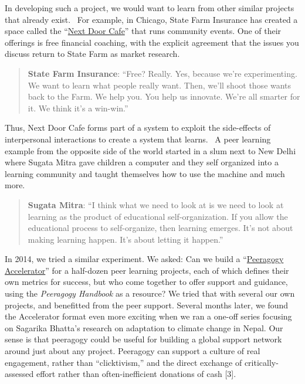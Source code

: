 In developing such a project, we would want to learn from other similar
projects that already exist. ~For example, in Chicago, State Farm
Insurance has created a space called the
``\href{https://www.nextdoorchi.com/}{Next Door Cafe}'' that runs
community events. One of their offerings is free financial coaching,
with the explicit agreement that the issues you discuss return to State
Farm as market research.

\begin{quote}
\textbf{State Farm Insurance}: ``Free? Really. Yes, because we're
experimenting. We want to learn what people really want. Then, we'll
shoot those wants back to the Farm. We help you. You help us innovate.
We're all smarter for it. We think it's a win-win.''
\end{quote}

Thus, Next Door Cafe forms part of a system to exploit the side-effects
of interpersonal interactions to create a system that learns.~ A peer
learning example from the opposite side of the world started in a slum
next to New Delhi where Sugata Mitra gave children a computer and they
self organized into a learning community and taught themselves how to
use the machine and much more.

\begin{quote}
\textbf{Sugata Mitra}: ``I think what we need to look at is we need to
look at learning as the product of educational self-organization. If you
allow the educational process to self-organize, then learning emerges.
It's not about making learning happen. It's about letting it happen.''
\end{quote}

In 2014, we tried a similar experiment. We asked: Can we build a
``\href{http://commonsabundance.net/docs/help-build-the-peeragogy-accelerator-work-in-progress/}{Peeragogy
Accelerator}'' for a half-dozen peer learning projects, each of which
defines their own metrics for success, but who come together to offer
support and guidance, using the \emph{Peeragogy Handbook} as a resource?
We tried that with several our own projects, and benefitted from the
peer support. Several months later, we found the Accelerator format even
more exciting when we ran a one-off series focusing on Sagarika Bhatta's
research on adaptation to climate change in Nepal. Our sense is that
peeragogy could be useful for building a global support network around
just about any project. Peeragogy can support a culture of real
engagement, rather than ``clicktivism,'' and the direct exchange of
critically-assessed effort rather than often-inefficient donations of
cash {[}3{]}.

